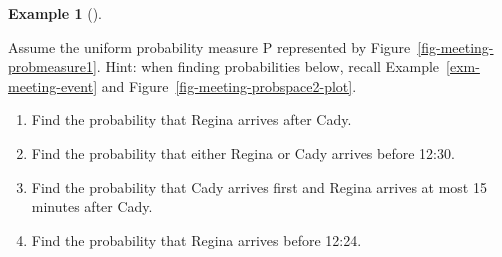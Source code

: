 \documentclass[
  letterpaper,
  DIV=11,
  numbers=noendperiod]{scrreprt}
\providecommand{\tightlist}{%
  \setlength{\itemsep}{0pt}\setlength{\parskip}{0pt}}
\theoremstyle{plain}
\theoremstyle{definition}
\newtheorem{example}{Example}[chapter]
\theoremstyle{definition}
\theoremstyle{definition}
\theoremstyle{remark}
\begin{document}
\begin{tcolorbox}[enhanced jigsaw, opacityback=0, left=2mm, colframe=quarto-callout-note-color-frame, toprule=.15mm, breakable, colback=white, leftrule=.75mm, arc=.35mm, rightrule=.15mm, bottomrule=.15mm]

\begin{example}[]\protect\hypertarget{exm-meeting-probspace2}{}\label{exm-meeting-probspace2}

Assume the uniform probability measure \(\textrm{P}\) represented by
Figure~\ref{fig-meeting-probmeasure1}. Hint: when finding probabilities
below, recall Example~\ref{exm-meeting-event} and
Figure~\ref{fig-meeting-probspace2-plot}.

\begin{enumerate}
\def\labelenumi{\arabic{enumi}.}
\tightlist
\item
  Find the probability that Regina arrives after Cady.
\item
  Find the probability that either Regina or Cady arrives before 12:30.
\item
  Find the probability that Cady arrives first and Regina arrives at
  most 15 minutes after Cady.
\item
  Find the probability that Regina arrives before 12:24.
\end{enumerate}

\end{example}

\end{tcolorbox}
\end{document}

